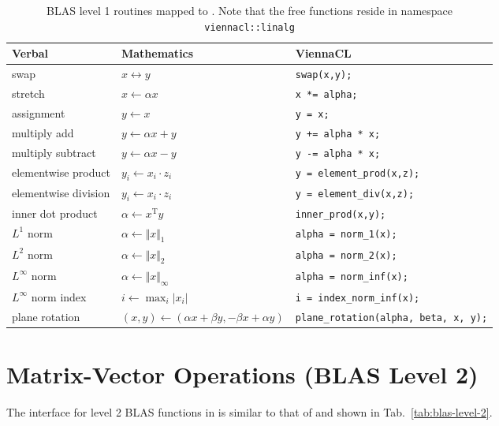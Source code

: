 \begin{table}[tb]
\begin{center}
\begin{tabular}{l|l|p{6cm}}
Verbal & Mathematics & ViennaCL\\
\hline
swap    & $x \leftrightarrow y$ & \lstinline|swap(x,y);| \\
stretch    & $x \leftarrow \alpha x$ & \lstinline|x *= alpha;| \\
assignment & $y \leftarrow x$ & \lstinline|y = x;| \\
multiply add & $y \leftarrow \alpha x + y$ & \lstinline|y += alpha * x;| \\
multiply subtract & $y \leftarrow \alpha x - y$ & \lstinline|y -= alpha * x;| \\
elementwise product & $y_i \leftarrow x_i \cdot z_i$ & \lstinline|y = element_prod(x,z);| \\
elementwise division & $y_i \leftarrow x_i \cdot z_i$ & \lstinline|y = element_div(x,z);| \\
inner dot product & $\alpha \leftarrow x^{\mathrm{T}} y$ & \lstinline|inner_prod(x,y);| \\
$L^1$ norm & $\alpha \leftarrow \Vert x \Vert_1$ & \lstinline|alpha = norm_1(x);| \\
$L^2$ norm & $\alpha \leftarrow \Vert x \Vert_2$ & \lstinline|alpha = norm_2(x);| \\
$L^\infty$ norm & $\alpha \leftarrow \Vert x \Vert_\infty$ & \lstinline|alpha = norm_inf(x);| \\
$L^\infty$ norm index& $i \leftarrow \max_i \vert x_i \vert$ & \lstinline|i = index_norm_inf(x);| \\
plane rotation & $(x,y) \leftarrow (\alpha x + \beta y, -\beta x + \alpha y)$ & \lstinline|plane_rotation(alpha, beta, x, y);| \\
\end{tabular}
\caption{BLAS level 1 routines mapped to {\ViennaCL}. Note that the free functions reside in namespace \texttt{viennacl::linalg}}
\label{tab:blas-level-1}
\end{center}
\end{table}
 
\section{Matrix-Vector Operations (BLAS Level 2)}
The interface for level 2 BLAS functions in {\ViennaCL} is similar to that of
{\ublas} and shown in Tab.~\ref{tab:blas-level-2}.

